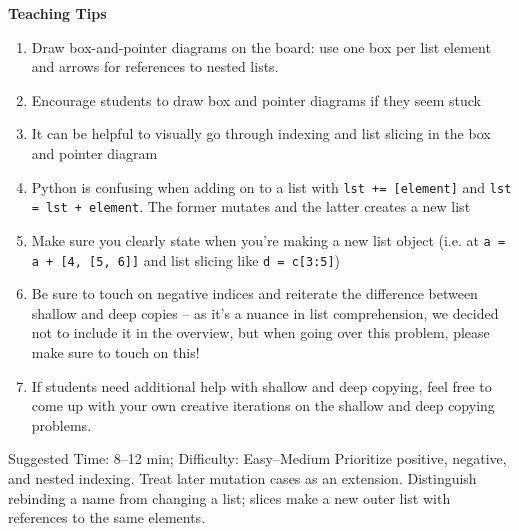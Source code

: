 \begin{questionmeta}
    \textbf{Teaching Tips}
    \begin{enumerate}
            \item Draw box-and-pointer diagrams on the board: use one box per list element and arrows for references to nested lists.
            \item Encourage students to draw box and pointer diagrams if they seem stuck
            \item It can be helpful to visually go through indexing and list slicing in the box and pointer diagram
            \item Python is confusing when adding on to a list with \lstinline{lst += [element]} and \lstinline{lst = lst + element}. The former mutates and the latter creates a new list
            \item Make sure you clearly state when you’re making a new list object (i.e. at \lstinline{a = a + [4, [5, 6]]} and list slicing like \lstinline{d = c[3:5]})
            \item Be sure to touch on negative indices and reiterate the difference between shallow and deep copies -- as it's a nuance in list comprehension, we decided not to include it in the overview, but when going over this problem, please make sure to touch on this!
            \item If students need additional help with shallow and deep copying, feel free to come up with your own creative iterations on the shallow and deep copying problems.
    \end{enumerate}
\end{questionmeta}

\begin{questionmeta}
    Suggested Time: 8--12 min; Difficulty: Easy--Medium
    Prioritize positive, negative, and nested indexing. Treat later mutation cases as an extension. Distinguish rebinding a name from changing a list; slices make a new outer list with references to the same elements.
\end{questionmeta}
